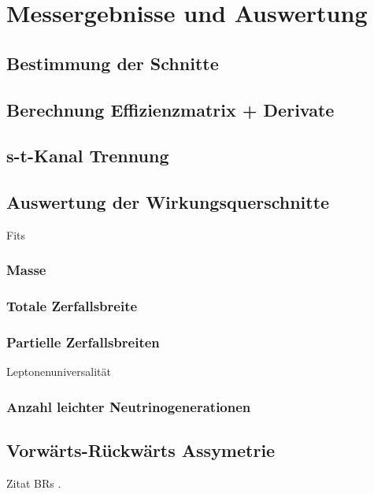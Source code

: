 \section{Messergebnisse und Auswertung}
\subsection{Bestimmung der Schnitte}
\subsection{Berechnung Effizienzmatrix + Derivate}
\subsection{s-t-Kanal Trennung}
\subsection{Auswertung der Wirkungsquerschnitte}
Fits
\subsubsection{Masse}
\subsubsection{Totale Zerfallsbreite}
\subsubsection{Partielle Zerfallsbreiten}
Leptonenuniversalität
\subsubsection{Anzahl leichter Neutrinogenerationen}
\subsection{Vorwärts-Rückwärts Assymetrie}

Zitat BRs \cite{pdg}.